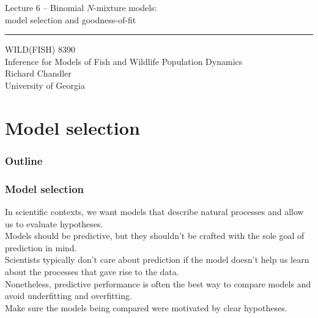 \documentclass[color=usenames,dvipsnames]{beamer}\usepackage[]{graphicx}\usepackage[]{xcolor}
\begin{document}
\begin{frame}[plain]
  \LARGE
  \centering
  {\LARGE Lecture 6 -- Binomial $N$-mixture models: \\
    model selection %
    and goodness-of-fit} \\  
  {\color{default} \rule{\textwidth}{0.1pt}}
  \vfill
  \large
  WILD(FISH) 8390 \\
  Inference for Models of Fish and Wildlife Population Dynamics \\
  \vfill
  \large
  Richard Chandler \\
  University of Georgia \\
\end{frame}





\section{Model selection}



\begin{frame}[plain]
  \frametitle{Outline}
  \Large
\end{frame}





\begin{frame}
  \frametitle{Model selection}
  In scientific contexts, we want models that describe natural
  processes and allow us to evaluate hypotheses. \\
  \pause
  \vfill
  Models should be predictive, but they shouldn't be crafted with the
  sole goal of prediction in mind. \\
  \pause
  \vfill
  Scientists typically don't care about prediction if the model
  doesn't help us learn about the processes that gave rise to the
  data. \\  
  \pause
  \vfill
  Nonetheless, predictive performance is often the best way
  to compare models and avoid underfitting and overfitting. \\
  \pause
  \vfill
  Make sure the models being compared were motivated by clear
  hypotheses.
\end{frame}
\end{document}
